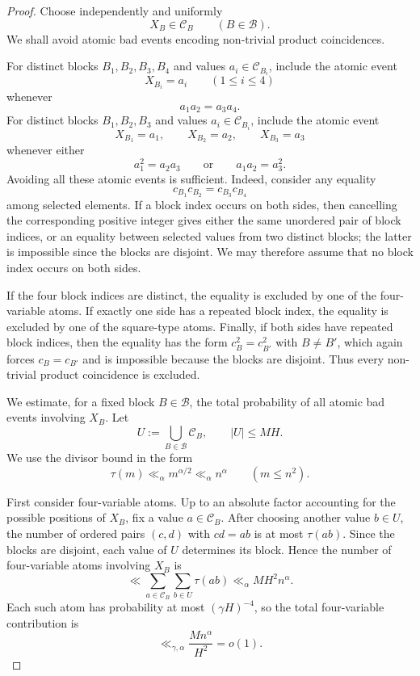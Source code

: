 \documentclass[11pt,reqno]{amsart}
\numberwithin{equation}{section}
\theoremstyle{plain}
\theoremstyle{definition}
\begin{document}
\begin{proof}
Choose independently and uniformly
\[
        X_B\in\mathcal C_B \qquad (B\in\mathcal B).
\]
We shall avoid atomic bad events encoding non-trivial product coincidences.

For distinct blocks \(B_1,B_2,B_3,B_4\) and values
\(a_i\in\mathcal C_{B_i}\), include the atomic event
\[
        X_{B_i}=a_i \qquad (1\le i\le 4)
\]
whenever
\[
        a_1a_2=a_3a_4.
\]
For distinct blocks \(B_1,B_2,B_3\) and values
\(a_i\in\mathcal C_{B_i}\), include the atomic event
\[
        X_{B_1}=a_1,\qquad X_{B_2}=a_2,\qquad X_{B_3}=a_3
\]
whenever either
\[
        a_1^2=a_2a_3
        \qquad\text{or}\qquad
        a_1a_2=a_3^2.
\]
Avoiding all these atomic events is sufficient.  Indeed, consider any equality
\[
        c_{B_1}c_{B_2}=c_{B_3}c_{B_4}
\]
among selected elements.  If a block index occurs on both sides, then
cancelling the corresponding positive integer gives either the same unordered
pair of block indices, or an equality between selected values from two distinct
blocks; the latter is impossible since the blocks are disjoint.  We may
therefore assume that no block index occurs on both sides.

If the four block indices are distinct, the equality is excluded by one of the
four-variable atoms.  If exactly one side has a repeated block index, the
equality is excluded by one of the square-type atoms.  Finally, if both sides
have repeated block indices, then the equality has the form
\(c_B^2=c_{B'}^2\) with \(B\ne B'\), which again forces \(c_B=c_{B'}\) and is
impossible because the blocks are disjoint.  Thus every non-trivial product
coincidence is excluded.

We estimate, for a fixed block \(B\in\mathcal B\), the total probability of all
atomic bad events involving \(X_B\).  Let
\[
        U:=\bigcup_{B\in\mathcal B}\mathcal C_B,
        \qquad |U|\le MH.
\]
We use the divisor bound in the form
\[
        \tau(m)\ll_\alpha m^{\alpha/2}\ll_\alpha n^\alpha
        \qquad (m\le n^2).
\]

First consider four-variable atoms.  Up to an absolute factor accounting for the
possible positions of \(X_B\), fix a value \(a\in\mathcal C_B\).  After choosing
another value \(b\in U\), the number of ordered pairs \((c,d)\) with
\(cd=ab\) is at most \(\tau(ab)\).  Since the blocks are disjoint, each value
of \(U\) determines its block.  Hence the number of four-variable atoms
involving \(X_B\) is
\[
        \ll \sum_{a\in\mathcal C_B}\sum_{b\in U}\tau(ab)
        \ll_\alpha M H^2 n^\alpha .
\]
Each such atom has probability at most \((\gamma H)^{-4}\), so the total
four-variable contribution is
\[
        \ll_{\gamma,\alpha} \frac{M n^\alpha}{H^2}=o(1).
\]


\end{proof}
\end{document}
